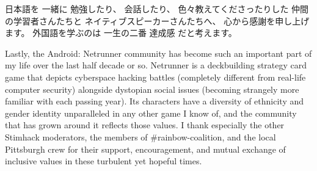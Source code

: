 \documentclass[12pt]{cmuthesis}
\begin{document}
\begin{acknowledgments}
{%
%
%
日本語を
一緒に
勉強したり、
会話したり、
色々教えてくださったりした
仲間の学習者さんたちと
ネイティブスピーカーさんたちへ、
心から感謝を申し上げます。
外国語を学ぶのは
一生の二番
達成感
だと考えます。

Lastly,
the Android: Netrunner community has become such an important part of my life
over the last half decade or so.
Netrunner is a deckbuilding strategy card game
that depicts cyberspace hacking battles (completely different from real-life computer security)
alongside dystopian social issues (becoming strangely more familiar with each passing year).
Its characters have a diversity of ethnicity and gender identity %
unparalleled in any other game I know of,
and the community that has grown around it reflects those values.
I thank especially the other Stimhack moderators,
the members of {\sf \#rainbow-coalition},
and the local Pittsburgh crew
for their support, encouragement,
and mutual exchange of inclusive values in these turbulent yet hopeful times.
}

\end{acknowledgments}
\end{document}
